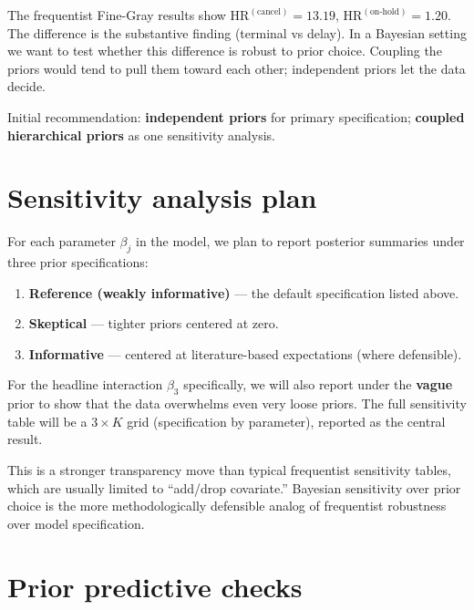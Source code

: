 \documentclass[11pt,a4paper]{article}
\newcommand{\HR}{\mathrm{HR}}
\begin{document}
\begin{rationale}
The frequentist Fine-Gray results show $\HR^{(\text{cancel})} = 13.19$, $\HR^{(\text{on-hold})} = 1.20$. The difference is the substantive finding (terminal vs delay). In a Bayesian setting we want to test whether this difference is robust to prior choice. Coupling the priors would tend to pull them toward each other; independent priors let the data decide.

Initial recommendation: \textbf{independent priors} for primary specification; \textbf{coupled hierarchical priors} as one sensitivity analysis.
\end{rationale}

\section{Sensitivity analysis plan}

For each parameter $\beta_j$ in the model, we plan to report posterior summaries under three prior specifications:

\begin{enumerate}
  \item \textbf{Reference (weakly informative)} --- the default specification listed above.
  \item \textbf{Skeptical} --- tighter priors centered at zero.
  \item \textbf{Informative} --- centered at literature-based expectations (where defensible).
\end{enumerate}

For the headline interaction $\beta_3$ specifically, we will also report under the \textbf{vague} prior to show that the data overwhelms even very loose priors. The full sensitivity table will be a $3 \times K$ grid (specification by parameter), reported as the central result.

\begin{rationale}
This is a stronger transparency move than typical frequentist sensitivity tables, which are usually limited to ``add/drop covariate.'' Bayesian sensitivity over prior choice is the more methodologically defensible analog of frequentist robustness over model specification.
\end{rationale}

\section{Prior predictive checks}
\end{document}
